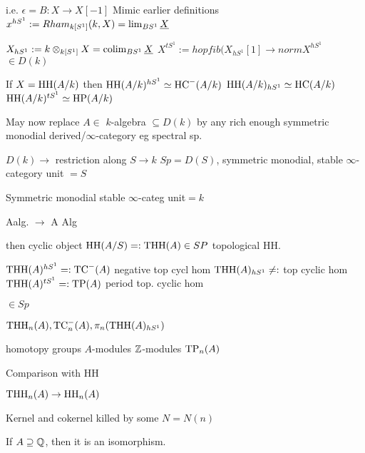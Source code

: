 i.e. $\epsilon=B: X \to X[-1]$
Mimic earlier definitions $x^{hS^1}:= Rham_{k[S^1]}(k,X) = \lim_{BS^1} \underline{X}$

$X_{hS^1}:= k \otimes_{k[S^1]} X= \operatorname{colim}_{BS^1} \underline{X}$
$X^{tS^1}:= hopfib(X_{hS^1}[1] \to norm X^{hS^1}$
$ \in D(k)$


If $X= \operatorname{HH}(A/k)$ then 
$\operatorname{HH}(A/k)^{hS^1} \simeq \operatorname{HC}^-(A/k)$
$\operatorname{HH}(A/k)_{hS^1} \simeq \operatorname{HC}(A/k)$
$\operatorname{HH}(A/k)^{tS^1} \simeq \operatorname{HP}(A/k)$

May now replace $A \in$ $k$-algebra $\subseteq D(k)$ by any rich enough symmetric monodial derived/$\infty$-category eg spectral sp.

$D(k) \to$ restriction along $S \to k$ $Sp=D(S)$, symmetric monodial, stable $\infty$-category unit $=S$

Symmetric monodial
stable $\infty$-categ
unit$=k$

Aalg. $\to$ A Alg


then cyclic object $\operatorname{HH}(A/S)=: \operatorname{THH}(A) \in SP$ topological HH. 

$\operatorname{THH}(A)^{hS^1}=: \operatorname{TC}^-(A)$ negative top cycl hom
$\operatorname{THH}(A)_{hS^1} \not=:$ top cyclic hom
$\operatorname{THH}(A)^{tS^1} =: \operatorname{TP}(A)$ period top. cyclic hom

$\in Sp$

$\operatorname{THH}_n(A), \operatorname{TC}_n^-(A), \pi_n(\operatorname{THH}(A)_{hS^1})$

homotopy groups
$A$-modules
$\mathbb{Z}$-modules
$\operatorname{TP}_n(A)$

Comparison with HH

$\operatorname{THH}_n(A) \to \operatorname{HH}_n(A)$

Kernel and cokernel killed by some $N= N(n)$

If $A \supseteq \mathbb{Q}$, then it is an isomorphism. 




























